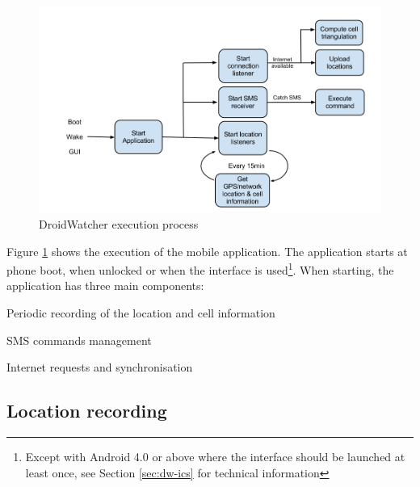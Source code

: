 \begin{figure}[h]
  \centering
  \includegraphics[width=\textwidth]{images/dw-schema.png}
  \caption{DroidWatcher execution process}
  \label{fig:dw-schema}
\end{figure}

Figure \ref{fig:dw-schema} shows the execution of the mobile application.
The application starts at phone boot, when unlocked or when the interface is used\footnote{Except with Android 4.0 or above where the interface should be launched at least once, see Section \ref{sec:dw-ics} for technical information}.
When starting, the application has three main components:
\begin{itemizealt}
\item Periodic recording of the location and cell information
\item SMS commands management
\item Internet requests and synchronisation%
\end{itemizealt}


\subsection{Location recording}

